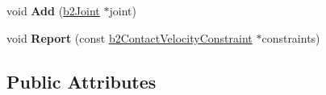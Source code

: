 \begin{DoxyCompactItemize}
\item 
void {\bfseries Add} (\hyperlink{classb2_joint}{b2\+Joint} $\ast$joint)\hypertarget{classb2_island_a04e6ccd0c11f6ef5a7ed0a926d081445}{}\label{classb2_island_a04e6ccd0c11f6ef5a7ed0a926d081445}

\item 
void {\bfseries Report} (const \hyperlink{structb2_contact_velocity_constraint}{b2\+Contact\+Velocity\+Constraint} $\ast$constraints)\hypertarget{classb2_island_a57620f76faf000f61c76e925e40e6129}{}\label{classb2_island_a57620f76faf000f61c76e925e40e6129}

\end{DoxyCompactItemize}
\subsection*{Public Attributes}
